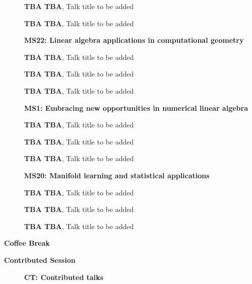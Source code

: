 \documentclass[ILAS2025-program.tex]{subfiles}
\begin{document}
\begin{description}
\begin{description}
        \item[] \textbf{TBA TBA}, Talk title to be added
        \item[] \textbf{TBA TBA}, Talk title to be added
        \end{description}
    \begin{description}
    \item[] \textbf{MS22: Linear algebra applications in computational geometry} 
    \item[] \textbf{TBA TBA}, Talk title to be added
        \item[] \textbf{TBA TBA}, Talk title to be added
        \item[] \textbf{TBA TBA}, Talk title to be added
        \end{description}
    \begin{description}
    \item[] \textbf{MS1: Embracing new opportunities in numerical linear algebra} 
    \item[] \textbf{TBA TBA}, Talk title to be added
        \item[] \textbf{TBA TBA}, Talk title to be added
        \item[] \textbf{TBA TBA}, Talk title to be added
        \end{description}
    \begin{description}
    \item[] \textbf{MS20: Manifold learning and statistical applications} 
    \item[] \textbf{TBA TBA}, Talk title to be added
        \item[] \textbf{TBA TBA}, Talk title to be added
        \item[] \textbf{TBA TBA}, Talk title to be added
        \end{description}
    \item[\info{15:30\textrm{--}16:00}] \textbf{Coffee Break} 
    \item[\info{16:00\textrm{--}17:30}] \textbf{Contributed Session} 
    \begin{description}
    \item[] \textbf{CT: Contributed talks} 

\end{description}
\end{description}
\end{document}
